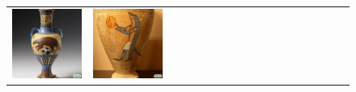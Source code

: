 \begin{figure}[ht!]
\begin{adjustwidth}{-0.8in}{-0.5in}
\begin{tabular}{cccccccccccccccccccc}
\multicolumn{2}{c}{\includegraphics[width=\threebythreecolwidth\textwidth]{figures/cherries/pangolin_soccer.jpg}} &
\multicolumn{2}{c}{\includegraphics[width=\threebythreecolwidth\textwidth]{figures/cherries/pangolin_basketball.jpg}}\\


\end{tabular}
\end{adjustwidth}
\end{figure}
